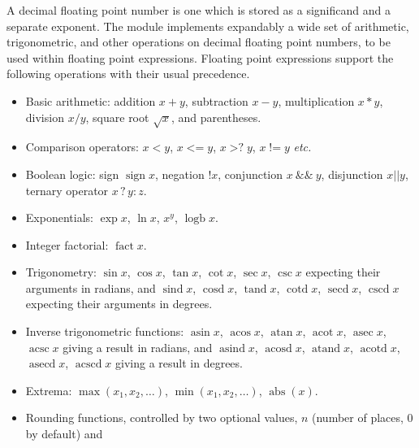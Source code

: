 \documentclass[oneside]{book}
\begin{document}
A decimal floating point number is one which is stored as a significand and a
separate exponent. The module implements expandably a wide set of
arithmetic, trigonometric, and other operations on decimal floating point
numbers, to be used within floating point expressions. Floating point
expressions support the following operations with their usual
precedence.
\begin{itemize}
\item Basic arithmetic: addition $x+y$, subtraction $x-y$,
multiplication $x*y$, division $x/y$, square root $\sqrt{x}$,
and parentheses.
\item Comparison operators: $x\mathop{\mathtt{<}}y$,
$x\mathop{\mathtt{<=}}y$, $x\mathop{\mathtt{>?}}y$,
$x\mathop{\mathtt{!=}}y$ \emph{etc.}
\item Boolean logic: sign $\operatorname{sign} x$,
negation $\mathop{!}x$, conjunction
$x\mathop{\&\&}y$, disjunction $x\mathop{\vert\vert}y$, ternary
operator $x\mathop{?}y\mathop{:}z$.
\item Exponentials: $\exp x$, $\ln x$, $x^y$, $\operatorname{logb} x$.
\item Integer factorial: $\operatorname{fact} x$.
\item Trigonometry: $\sin x$, $\cos x$, $\tan x$, $\cot x$, $\sec
x$, $\csc x$ expecting their arguments in radians, and
$\operatorname{sind} x$, $\operatorname{cosd} x$,
$\operatorname{tand} x$, $\operatorname{cotd} x$,
$\operatorname{secd} x$, $\operatorname{cscd} x$ expecting their
arguments in degrees.
\item Inverse trigonometric functions: $\operatorname{asin} x$,
$\operatorname{acos} x$, $\operatorname{atan} x$,
$\operatorname{acot} x$, $\operatorname{asec} x$,
$\operatorname{acsc} x$ giving a result in radians, and
$\operatorname{asind} x$, $\operatorname{acosd} x$,
$\operatorname{atand} x$, $\operatorname{acotd} x$,
$\operatorname{asecd} x$, $\operatorname{acscd} x$ giving a result
in degrees.
\item Extrema: $\max(x_{1},x_{2},\ldots)$, $\min(x_{1},x_{2},\ldots)$,
$\operatorname{abs}(x)$.
\item Rounding functions, controlled by two optional
values,  $n$ (number of places, $0$ by default) and

\end{itemize}
\end{document}
